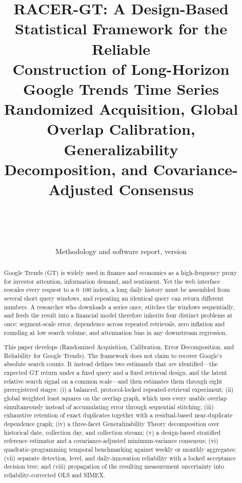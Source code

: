 \documentclass[12pt,a4paper,oneside]{article}
\title{\bfseries
RACER-GT: A Design-Based Statistical Framework for the Reliable\\
Construction of Long-Horizon Google Trends Time Series\\[0.6em]
\large Randomized Acquisition, Global Overlap Calibration, Generalizability\\
Decomposition, and Covariance-Adjusted Consensus
}
\author{\racerauthor\\
\small \raceraffil\\
\small \texttt{\raceremail}}
\date{\racerdate\\[0.4em]\small Methodology and software report, version \racerversion}
\begin{document}
\maketitle

\begin{abstract}
\noindent Google Trends (GT) is widely used in finance and economics as a
high-frequency proxy for investor attention, information demand, and sentiment.
Yet the web interface rescales every request to a $0$--$100$ index, a long daily
history must be assembled from several short query windows, and repeating an
identical query can return different numbers. A researcher who downloads a
series once, stitches the windows sequentially, and feeds the result into a
financial model therefore inherits four distinct problems at once: segment-scale
error, dependence across repeated retrievals, zero inflation and rounding at low
search volume, and attenuation bias in any downstream regression.

This paper develops \RACER{} (Randomized Acquisition, Calibration, Error
Decomposition, and Reliability for Google Trends). The framework does not claim
to recover Google's absolute search counts. It instead defines two estimands
that \emph{are} identified---the expected GT return under a fixed query and a
fixed retrieval design, and the latent relative search signal on a common
scale---and then estimates them through eight preregistered stages: (i) a
balanced, protocol-locked repeated-retrieval experiment; (ii) global weighted
least squares on the overlap graph, which uses every usable overlap
simultaneously instead of accumulating error through sequential stitching;
(iii) exhaustive retention of exact duplicates together with a residual-based
near-duplicate dependence graph; (iv) a three-facet Generalizability Theory
decomposition over historical date, collection day, and collection stream;
(v) a design-based stratified reference estimator and a covariance-adjusted
minimum-variance consensus; (vi) quadratic-programming temporal benchmarking
against weekly or monthly aggregates; (vii) separate detection, level, and
daily-innovation reliability with a locked acceptance decision tree; and
(viii) propagation of the resulting measurement uncertainty into
reliability-corrected OLS and SIMEX.


\end{abstract}
\end{document}
